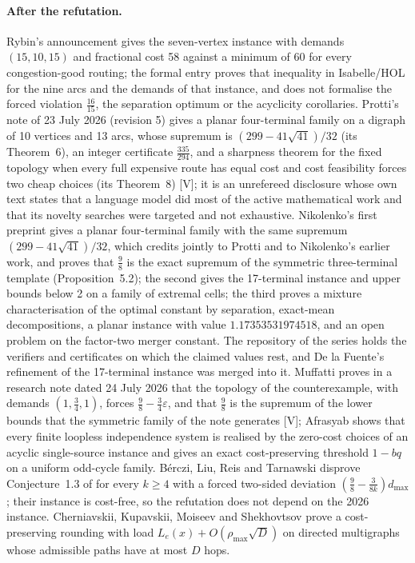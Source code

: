 \documentclass[11pt]{article}
\theoremstyle{remark}
\newcommand{\dmax}{d_{\max}}
\begin{document}
\paragraph{After the refutation.} Rybin's announcement \cite{Ryb26} gives the seven-vertex instance with demands
$(15,10,15)$ and fractional cost 58 against a minimum of 60 for every congestion-good routing; the formal entry
\cite{AFP26} proves that inequality in Isabelle/HOL for the nine arcs and the demands of that instance, and
does not formalise the forced violation $\tfrac{16}{15}$, the separation optimum or the acyclicity corollaries.
Protti's note \cite{Pro26} of 23 July 2026 (revision 5) gives a planar four-terminal family on a digraph of 10 vertices and 13 arcs, whose supremum is
$(299-41\sqrt{41})/32$ (its Theorem~6), an integer certificate $\tfrac{335}{294}$, and a sharpness theorem for the fixed
topology when every full expensive route has equal cost and cost feasibility forces two cheap choices (its Theorem~8) [V];
it is an unrefereed disclosure whose own text states that a language model did most of the active mathematical work and that its
novelty searches were targeted and not exhaustive. Nikolenko's first preprint \cite{Nik1} gives a planar four-terminal family with the same supremum
$(299-41\sqrt{41})/32$, which \cite{Nik3} credits jointly to Protti and to Nikolenko's earlier work, and proves that $\tfrac98$ is the exact supremum of the symmetric three-terminal
template (Proposition~5.2); the second \cite{Nik2} gives the 17-terminal instance and upper bounds below 2 on a family of extremal
cells; the third \cite{Nik3} proves a mixture characterisation of the optimal constant by separation, exact-mean
decompositions, a planar instance with value $1.17353531974518$, and an open problem on the factor-two merger
constant. The repository of the series \cite{NikRepo} holds the verifiers and certificates on which the
claimed values rest, and De la Fuente's refinement \cite{DLF26} of the 17-terminal instance was merged into it.
Muffatti \cite{Muf26} proves in a research note dated 24 July 2026 that the topology of the counterexample, with demands
$(1,\tfrac34,1)$, forces $\tfrac98-\tfrac34\varepsilon$, and that $\tfrac98$ is the supremum of the lower bounds that the symmetric family of the note generates
[V]; Afrasyab \cite{Afr26} shows that every finite loopless
independence system is realised by the zero-cost choices of an acyclic single-source instance and gives an exact
cost-preserving threshold $1-bq$ on a uniform odd-cycle family. Bérczi, Liu, Reis and Tarnawski \cite{BLRT26}
disprove Conjecture~1.3 of \cite{STVZ25} for every $k\ge4$ with a forced two-sided deviation
$(\tfrac98-\tfrac3{8k})\dmax$; their instance is cost-free, so the refutation does not depend on the 2026
instance. Cherniavskii, Kupavskii, Moiseev and Shekhovtsov \cite{CKMS26} prove a cost-preserving rounding with load
$L_e(x)+O(\rho_{\max}\sqrt{D})$ on directed multigraphs whose admissible paths have at most $D$ hops.
\end{document}
